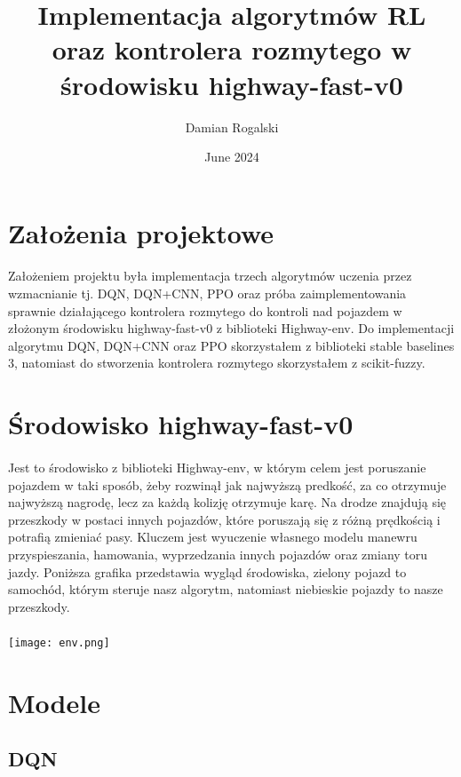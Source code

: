 \documentclass{article}
\title{Implementacja algorytmów RL oraz kontrolera rozmytego w środowisku highway-fast-v0}
\author{Damian Rogalski}
\date{June 2024}
\begin{document}
\maketitle

\section{Założenia projektowe}
\paragraph{}
Założeniem projektu była implementacja trzech algorytmów uczenia przez wzmacnianie tj. DQN, DQN+CNN, PPO oraz próba zaimplementowania sprawnie działającego kontrolera rozmytego do kontroli nad pojazdem w złożonym środowisku highway-fast-v0 z biblioteki Highway-env. Do implementacji algorytmu DQN, DQN+CNN oraz PPO skorzystałem z biblioteki stable baselines 3, natomiast do stworzenia kontrolera rozmytego skorzystałem z scikit-fuzzy.

\section{Środowisko highway-fast-v0}
\paragraph{}
Jest to środowisko z biblioteki Highway-env, w którym celem jest poruszanie pojazdem w taki sposób, żeby rozwinął jak najwyższą predkość, za co otrzymuje najwyższą nagrodę, lecz za każdą kolizję otrzymuje karę. Na drodze znajdują się przeszkody w postaci innych pojazdów, które poruszają się z różną prędkością i potrafią zmieniać pasy. Kluczem jest wyuczenie własnego modelu manewru przyspieszania, hamowania, wyprzedzania innych pojazdów oraz zmiany toru jazdy.
Poniższa grafika przedstawia wygląd środowiska, zielony pojazd to samochód, którym steruje nasz algorytm, natomiast niebieskie pojazdy to nasze przeszkody.

\paragraph{}
\texttt{[image: env.png]}

\newpage


\section{Modele}
\subsection{DQN}
\end{document}
